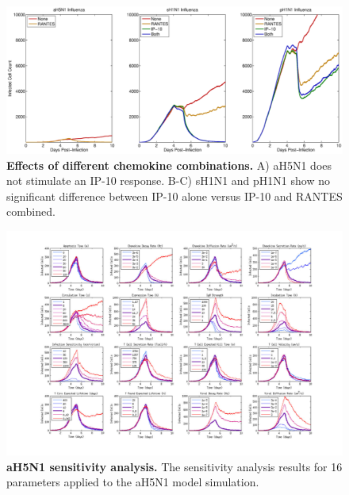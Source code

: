 \documentclass[10pt]{article}
\begin{document}
\begin{figure}[ht!]
\begin{center}
	\includegraphics[width=\textwidth]{Figure_S2}
	\caption{\textbf{Effects of different chemokine combinations.}  A) aH5N1 does not stimulate an IP-10 response.  B-C) sH1N1 and pH1N1 show no significant difference between IP-10 alone versus IP-10 and RANTES combined.}
	\label{fig:chemokine}
\end{center}
\end{figure}

\begin{figure}[ht!]
\begin{center}
	\includegraphics[width=\textwidth]{Figure_S3}
	\caption{\textbf{aH5N1 sensitivity analysis.} The sensitivity analysis results for 16 parameters applied to the aH5N1 model simulation.}
	\label{fig:asensitivity}
\end{center}
\end{figure}
\end{document}

